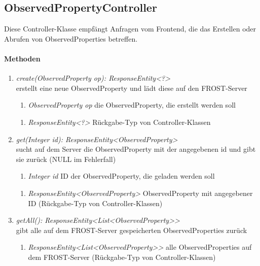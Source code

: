 \subsection{ObservedPropertyController}
Diese Controller-Klasse empfängt Anfragen vom Frontend, die das Erstellen oder Abrufen von ObservedProperties betreffen.

\paragraph{Methoden}

\begin{enumerate}[+]
	\item \textit{ create(ObservedProperty op): ResponseEntity<?> }\\
	erstellt eine neue ObservedProperty und lädt diese auf den FROST-Server
	
	\begin{enumerate}[$\bullet$]
		\item \textit{ObservedProperty op} die ObservedProperty, die erstellt werden soll
		
	\end{enumerate}
	\vspace{-0.2cm}
	\begin{enumerate}[$\circ$]
		\item \textit{ResponseEntity<?>} Rückgabe-Typ von Controller-Klassen
	\end{enumerate}
	
	\item \textit{ get(Integer id): ResponseEntity<ObservedProperty> }\\
	sucht auf dem Server die ObservedProperty mit der angegebenen id und gibt sie zurück (NULL im Fehlerfall)
	
	\begin{enumerate}[$\bullet$]
		\item \textit{Integer id} ID der ObservedProperty, die geladen werden soll
		
	\end{enumerate}
	\vspace{-0.2cm}
	\begin{enumerate}[$\circ$]
		\item \textit{ResponseEntity<ObservedProperty>} ObservedProperty mit angegebener ID (Rückgabe-Typ von Controller-Klassen)
	\end{enumerate}
	\item \textit{ getAll(): ResponseEntity<List<ObservedProperty>> }\\
	gibt alle auf dem FROST-Server gespeicherten ObservedProperties zurück
	
	\begin{enumerate}[$\circ$]
		\item \textit{ResponseEntity<List<ObservedProperty>>} alle ObservedProperties auf dem FROST-Server (Rückgabe-Typ von Controller-Klassen)
	\end{enumerate}
	
	
\end{enumerate}	